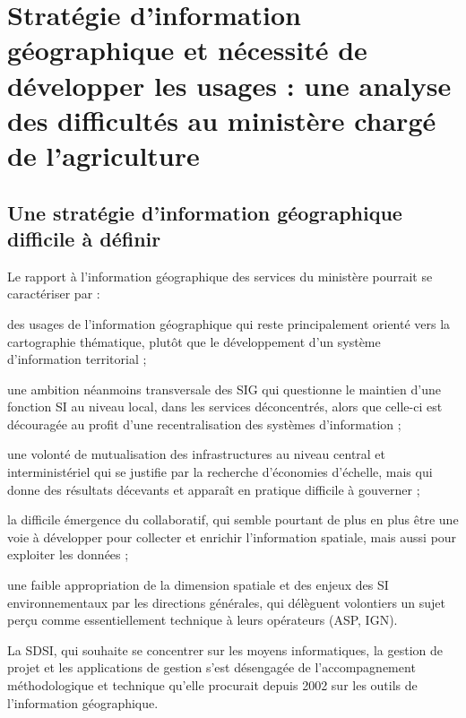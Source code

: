 \section[constats]
{Stratégie d'information géographique et nécessité de développer
les usages : une analyse des difficultés au ministère chargé de l'agriculture}


\subsection[constats:strategie]
{Une stratégie d'information géographique difficile à définir}


Le rapport à l'information géographique des services du ministère
pourrait se caractériser par :

\startitemize

\item des usages de l'information géographique
      qui reste principalement orienté vers la cartographie thématique,
      plutôt que le développement d'un système d'information territorial ;

\item une ambition néanmoins transversale des SIG qui questionne
      le maintien d'une fonction SI au niveau local,
      dans les services déconcentrés, alors que celle-ci est découragée
      au profit d'une recentralisation des systèmes d'information ;      

\item une volonté de mutualisation des infrastructures au niveau central et interministériel
      qui se justifie par la recherche d'économies d'échelle,
      mais qui donne des résultats décevants
      et apparaît en pratique difficile à gouverner ;

\item la difficile émergence du collaboratif,
      qui semble pourtant de plus en plus être une voie à développer
      pour collecter et enrichir l'information spatiale,
      mais aussi pour exploiter les données ;

\item une faible appropriation de la dimension spatiale
      et des enjeux des SI environnementaux
      par les directions générales,
      qui délèguent volontiers un sujet perçu comme essentiellement
      technique à leurs opérateurs (ASP, IGN).

\stopitemize

La SDSI, qui souhaite se concentrer sur les moyens informatiques,
la gestion de projet et les applications de gestion
s'est désengagée de l'accompagnement méthodologique et technique
qu'elle procurait depuis 2002 sur les outils de l'information géographique.

